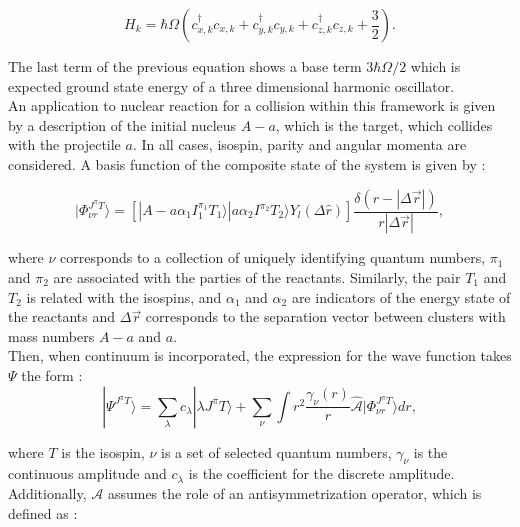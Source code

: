 \documentclass[openany]{book}
\begin{document}
\begin{equation}\label{eq:micro_NCSM_symmetric_Hamiltonian}
	H_k = \hbar \Omega \left (c^{\dagger}_{x, k} c_{x, k} + c^{\dagger}_{y, k} c_{y, k} +  c^{\dagger}_{z, k} c_{z, k} +  \frac{3}{2}  \right).
\end{equation}

The last term of the previous equation shows a base term  $3\hbar\Omega/2$ which is expected ground state energy of a three dimensional harmonic oscillator. \\

An application to nuclear reaction for a collision within this framework is given by a description of the initial nucleus $A - a$, which is the target, which collides with the projectile $a$. In all cases, isospin, parity and angular momenta are considered. A basis function of the composite state of the system is given by \cite{barrett_navratil_vary_2013}:

\begin{equation}\label{eq:micro_noCoreShell_basis}
	| \Phi^{J^{\pi} T}_{\nu r} \rangle  = \left [ |A -a \alpha_1 I^{\pi_1}_1 T_1 \rangle | a \alpha_2  I^{\pi_2} T_2 \rangle  Y_l (\Delta \hat r)\right] \frac{\delta(r - |\Delta \vec r|)}{r  |\Delta \vec r|}, 
\end{equation}

where $\nu$ corresponds to a collection of uniquely identifying quantum numbers, $\pi_1$ and $\pi_2$ are associated with the parties of the reactants. Similarly, the pair $T_1$ and $T_2$ is related with the isospins, and $\alpha_1$ and $\alpha_2$ are indicators of the energy state of the reactants and  $\Delta \vec r$ corresponds to the separation vector between clusters with mass numbers $A - a$ and $a$.\\

Then, when continuum is incorporated, the expression for the wave function takes $\Psi$ the form \cite{dohet-eraly_navratil_quaglioni_horiuchi_hupin_raimondi_2016}:  \\

\begin{equation}\label{eq:micro_noCoreShell_continuum}
	| \Psi^{J^{\pi} T} \rangle  = \sum_{\lambda} c_\lambda | \lambda J^{\pi} T \rangle  + \sum_{\nu} { \int {r^2 \frac{\gamma_\nu(r)}{r} \hat {\mathcal{A} }  | \Phi^{J^{\pi} T}_{\nu r} \rangle dr} },
\end{equation}

where $T$ is the isospin, $\nu$ is a set of selected quantum numbers, $\gamma_\nu$ is the continuous amplitude and $c_\lambda$ is the coefficient for the discrete amplitude. Additionally, $\mathcal{A}$ assumes the role of an antisymmetrization operator, which is defined as \cite{freer_horiuchi_kanada-enyo_lee_meisner_2018}: 
\end{document}
